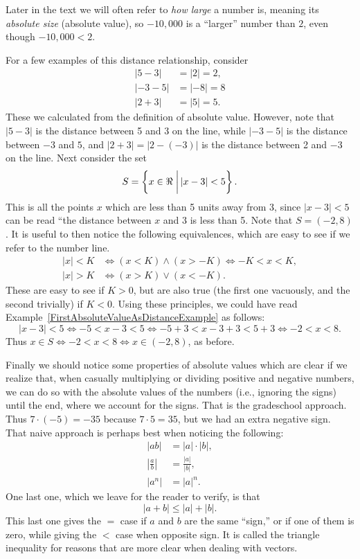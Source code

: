 Later in the text we will often refer to {\it how large} 
a number is, meaning its
{\it absolute size} (absolute value), so $-10,000$ is a ``larger''
number than $2$, even though $-10,000<2$.

For a few examples of this distance relationship, consider
\begin{align}
 |5-3|&=|2|=2,\\
 |-3-5|&=|-8|=8\\
 |2+3|&=|5|=5.\end{align}
These we calculated from the definition of absolute value. However,
note that $|5-3|$ is the distance between 5 and 3 on the line,
while $|-3-5|$ is the distance between $-3$ and $5$, and
$|2+3|=|2-(-3)|$ is the distance between 2 and $-3$ on the line.
\bex 
Next consider the set
$$S=\left\{x\in\Re\left.\vphantom{\frac11}\right| |x-3|<5\right\}.$$
This is all the points $x$ which are less than 5 units away from
3, since $|x-3|<5$ can be read ``the distance between $x$ and 3
is less than 5.  Note that $S=(-2,8)$.
\label{FirstAbsoluteValueAsDistanceExample}\eex
It is useful to then notice the following equivalences, which are
easy to see if we refer to the number line.
\begin{align*}
 |x|<K&\iff (x<K)\wedge(x>-K)\iff -K<x<K,\\
 |x|>K&\iff (x>K)\vee(x<-K).\end{align*}
These are easy to see if $K>0$, but are also true (the first one
vacuously, and the second trivially) if $K<0$.  Using these principles,
we could have read Example~\ref{FirstAbsoluteValueAsDistanceExample}
as follows:
$$ |x-3|<5\iff -5<x-3<5\iff-5+3<x-3+3<5+3\iff -2<x<8.$$
Thus $x\in S\iff -2<x<8\iff x\in(-2,8)$, as before.

Finally we should notice some properties of absolute values
which are clear if we realize that, when casually multiplying or dividing
positive and negative numbers, we can do so with the absolute values
of the numbers (i.e., ignoring the signs) until the end, where
we account for the signs.  That is the gradeschool approach.
Thus $7\cdot(-5)=-35$ because $7\cdot5=35$, but we had an extra
negative sign.  That naive approach is perhaps best when noticing the
following:
\begin{align}
|ab|&=|a|\cdot|b|,\\
\left|\frac{a}b\right|&=\frac{|a|}{|b|},\\
\left|a^n\right|&=|a|^n.\end{align}
One last one, which we leave for the reader to verify, is that
\begin{equation}|a+b|\le|a|+|b|.\label{TriangleInequality1}\end{equation}
This last one gives the $=$ case if $a$ and $b$ are the same ``sign,''
or if one of them is zero, while giving the $<$ case when opposite sign.
It is called the triangle inequality for reasons that are more clear
when dealing with vectors.
